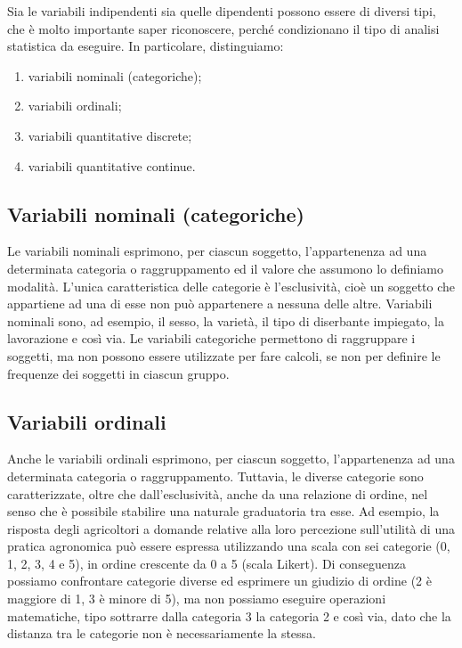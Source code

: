 \documentclass[a4paper,12pt,oneside]{book}
\providecommand{\tightlist}{%
  \setlength{\itemsep}{0pt}\setlength{\parskip}{0pt}}
\begin{document}
Sia le variabili indipendenti sia quelle dipendenti possono essere di diversi tipi, che è molto importante saper riconoscere, perché condizionano il tipo di analisi statistica da eseguire. In particolare, distinguiamo:

\begin{enumerate}
\def\labelenumi{\arabic{enumi}.}
\tightlist
\item
  variabili nominali (categoriche);
\item
  variabili ordinali;
\item
  variabili quantitative discrete;
\item
  variabili quantitative continue.
\end{enumerate}

\hypertarget{variabili-nominali-categoriche}{%
\subsection{Variabili nominali (categoriche)}\label{variabili-nominali-categoriche}}

Le variabili nominali esprimono, per ciascun soggetto, l'appartenenza ad una determinata categoria o raggruppamento ed il valore che assumono lo definiamo modalità. L'unica caratteristica delle categorie è l'esclusività, cioè un soggetto che appartiene ad una di esse non può appartenere a nessuna delle altre. Variabili nominali sono, ad esempio, il sesso, la varietà, il tipo di diserbante impiegato, la lavorazione e così via. Le variabili categoriche permettono di raggruppare i soggetti, ma non possono essere utilizzate per fare calcoli, se non per definire le frequenze dei soggetti in ciascun gruppo.

\hypertarget{variabili-ordinali}{%
\subsection{Variabili ordinali}\label{variabili-ordinali}}

Anche le variabili ordinali esprimono, per ciascun soggetto, l'appartenenza ad una determinata categoria o raggruppamento. Tuttavia, le diverse categorie sono caratterizzate, oltre che dall'esclusività, anche da una relazione di ordine, nel senso che è possibile stabilire una naturale graduatoria tra esse. Ad esempio, la risposta degli agricoltori a domande relative alla loro percezione sull'utilità di una pratica agronomica può essere espressa utilizzando una scala con sei categorie (0, 1, 2, 3, 4 e 5), in ordine crescente da 0 a 5 (scala Likert). Di conseguenza possiamo confrontare categorie diverse ed esprimere un giudizio di ordine (2 è maggiore di 1, 3 è minore di 5), ma non possiamo eseguire operazioni matematiche, tipo sottrarre dalla categoria 3 la categoria 2 e così via, dato che la distanza tra le categorie non è necessariamente la stessa.
\end{document}
